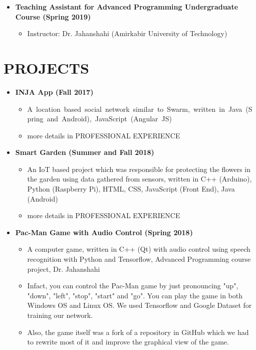 \begin{itemize}
		\vspace{+1 em}
		\item \textbf{Teaching Assistant for Advanced Programming Undergraduate Course (Spring 2019)} 
		\begin{itemize}
			\item Instructor: Dr. Jahanshahi (Amirkabir University of Technology)
		\end{itemize}

\end{itemize}

\section{PROJECTS}
\begin{itemize}
	\item \textbf{INJA App (Fall 2017)} 
		\begin{itemize}
		\item \mbox{A location based social network similar to Swarm, written in Java (Spring and Android),
				JavaScript (Angular JS)}
		\item more details in PROFESSIONAL EXPERIENCE
		\end{itemize}
	
	\vspace{+1 em}
	\item \textbf{Smart Garden (Summer and Fall 2018)} 
		\begin{itemize}
			\item An IoT based project which was responsible for protecting the flowers in the garden using data gathered from sensors, written in C++ (Arduino), Python (Raspberry Pi), HTML, CSS, JavaScript (Front End), Java (Android)
			\item more details in PROFESSIONAL EXPERIENCE
		\end{itemize}	
	
	\vspace{+1 em}
	\item \textbf{Pac-Man Game with Audio Control (Spring 2018)} 
		\begin{itemize}
			\item A computer game, written in C++ (Qt) with audio control using speech recognition with Python and Tensorflow, Advanced Programming course project, Dr. Jahanshahi
\item Infact, you can control the Pac-Man game by just pronouncing "up", "down", "left", "stop", "start" and "go". You can play the game in both Windows OS and Linux OS.
We used Tensorflow and Google Dataset for training our network. 
\item Also, the game itself was a fork of a repository in GitHub which we had to rewrite most of it and improve the graphical view of the game.
		\end{itemize}	


\end{itemize}
